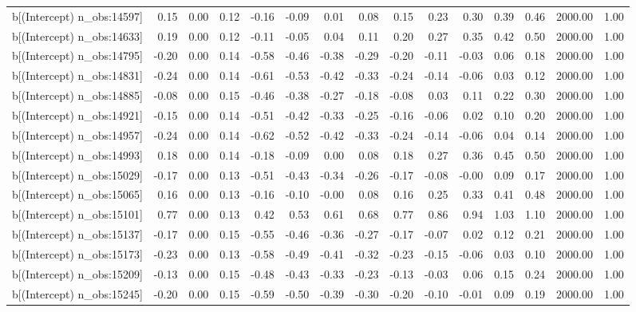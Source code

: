 \begin{table}[ht]
\begin{tabular}{rrrrrrrrrrrrrrr}
  b[(Intercept) n\_obs:14597] & 0.15 & 0.00 & 0.12 & -0.16 & -0.09 & 0.01 & 0.08 & 0.15 & 0.23 & 0.30 & 0.39 & 0.46 & 2000.00 & 1.00 \\ 
  b[(Intercept) n\_obs:14633] & 0.19 & 0.00 & 0.12 & -0.11 & -0.05 & 0.04 & 0.11 & 0.20 & 0.27 & 0.35 & 0.42 & 0.50 & 2000.00 & 1.00 \\ 
  b[(Intercept) n\_obs:14795] & -0.20 & 0.00 & 0.14 & -0.58 & -0.46 & -0.38 & -0.29 & -0.20 & -0.11 & -0.03 & 0.06 & 0.18 & 2000.00 & 1.00 \\ 
  b[(Intercept) n\_obs:14831] & -0.24 & 0.00 & 0.14 & -0.61 & -0.53 & -0.42 & -0.33 & -0.24 & -0.14 & -0.06 & 0.03 & 0.12 & 2000.00 & 1.00 \\ 
  b[(Intercept) n\_obs:14885] & -0.08 & 0.00 & 0.15 & -0.46 & -0.38 & -0.27 & -0.18 & -0.08 & 0.03 & 0.11 & 0.22 & 0.30 & 2000.00 & 1.00 \\ 
  b[(Intercept) n\_obs:14921] & -0.15 & 0.00 & 0.14 & -0.51 & -0.42 & -0.33 & -0.25 & -0.16 & -0.06 & 0.02 & 0.10 & 0.20 & 2000.00 & 1.00 \\ 
  b[(Intercept) n\_obs:14957] & -0.24 & 0.00 & 0.14 & -0.62 & -0.52 & -0.42 & -0.33 & -0.24 & -0.14 & -0.06 & 0.04 & 0.14 & 2000.00 & 1.00 \\ 
  b[(Intercept) n\_obs:14993] & 0.18 & 0.00 & 0.14 & -0.18 & -0.09 & 0.00 & 0.08 & 0.18 & 0.27 & 0.36 & 0.45 & 0.50 & 2000.00 & 1.00 \\ 
  b[(Intercept) n\_obs:15029] & -0.17 & 0.00 & 0.13 & -0.51 & -0.43 & -0.34 & -0.26 & -0.17 & -0.08 & -0.00 & 0.09 & 0.17 & 2000.00 & 1.00 \\ 
  b[(Intercept) n\_obs:15065] & 0.16 & 0.00 & 0.13 & -0.16 & -0.10 & -0.00 & 0.08 & 0.16 & 0.25 & 0.33 & 0.41 & 0.48 & 2000.00 & 1.00 \\ 
  b[(Intercept) n\_obs:15101] & 0.77 & 0.00 & 0.13 & 0.42 & 0.53 & 0.61 & 0.68 & 0.77 & 0.86 & 0.94 & 1.03 & 1.10 & 2000.00 & 1.00 \\ 
  b[(Intercept) n\_obs:15137] & -0.17 & 0.00 & 0.15 & -0.55 & -0.46 & -0.36 & -0.27 & -0.17 & -0.07 & 0.02 & 0.12 & 0.21 & 2000.00 & 1.00 \\ 
  b[(Intercept) n\_obs:15173] & -0.23 & 0.00 & 0.13 & -0.58 & -0.49 & -0.41 & -0.32 & -0.23 & -0.15 & -0.06 & 0.03 & 0.10 & 2000.00 & 1.00 \\ 
  b[(Intercept) n\_obs:15209] & -0.13 & 0.00 & 0.15 & -0.48 & -0.43 & -0.33 & -0.23 & -0.13 & -0.03 & 0.06 & 0.15 & 0.24 & 2000.00 & 1.00 \\ 
  b[(Intercept) n\_obs:15245] & -0.20 & 0.00 & 0.15 & -0.59 & -0.50 & -0.39 & -0.30 & -0.20 & -0.10 & -0.01 & 0.09 & 0.19 & 2000.00 & 1.00 \\ 

\end{tabular}
\end{table}
